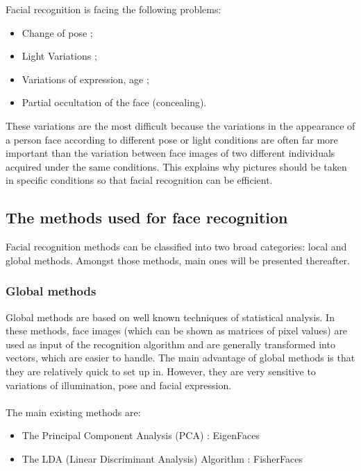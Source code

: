 Facial recognition is facing the following problems:
\begin{itemize}
\item Change of pose ;
\item Light Variations ;
\item Variations of expression, age ;
\item Partial occultation of the face (concealing).
\end{itemize}

These variations are the most difficult because the variations in the appearance of a person face according to different pose or light conditions are often far more important than the variation between face images of two different individuals acquired under the same conditions.
This explains why pictures should be taken in specific conditions so that facial recognition can be efficient.

\subsection{The methods used for face recognition}	

Facial recognition methods can be classified into two broad categories: local and global methods. Amongst those methods, main ones will be presented thereafter.



\subsubsection{Global methods}

Global methods are based on well known techniques of statistical analysis. In these methods, face images (which can be shown as matrices of pixel values) are used as input of the recognition algorithm and are generally transformed into vectors, which are easier to handle. The main advantage of global methods is that they are relatively quick to set up in. However, they are very sensitive to variations of illumination, pose and facial expression.
\paragraph{}
The main existing methods are:
\begin{itemize}
\item The Principal Component Analysis (PCA) : EigenFaces
\item The LDA (Linear Discriminant Analysis) Algorithm : FisherFaces
\end{itemize}

